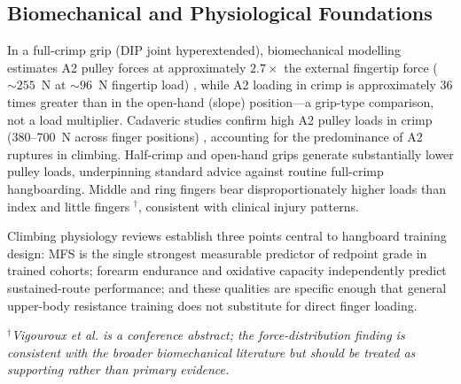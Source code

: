 \subsection{Biomechanical and Physiological Foundations}

In a full-crimp grip (DIP joint hyperextended), biomechanical modelling estimates A2 pulley forces at approximately $2.7\times$ the external fingertip force (${\sim}255$~N at ${\sim}96$~N fingertip load) \cite{VQLVM06}, while A2 loading in crimp is approximately 36 times greater than in the open-hand (slope) position---a grip-type comparison, not a load multiplier. Cadaveric studies confirm high A2 pulley loads in crimp (380--700~N across finger positions) \cite{Sch01}, accounting for the predominance of A2 ruptures in climbing. Half-crimp and open-hand grips generate substantially lower pulley loads, underpinning standard advice against routine full-crimp hangboarding. Middle and ring fingers bear disproportionately higher loads than index and little fingers \cite{VQPC08}$^{\dagger}$, consistent with clinical injury patterns.

Climbing physiology reviews \cite{Wat04, MSB+07, FSS+16} establish three points central to hangboard training design: MFS is the single strongest measurable predictor of redpoint grade in trained cohorts; forearm endurance and oxidative capacity independently predict sustained-route performance; and these qualities are specific enough that general upper-body resistance training does not substitute for direct finger loading.

\smallskip
\noindent$^{\dagger}$\textit{Vigouroux et al. \cite{VQPC08} is a conference abstract; the force-distribution finding is consistent with the broader biomechanical literature but should be treated as supporting rather than primary evidence.}
